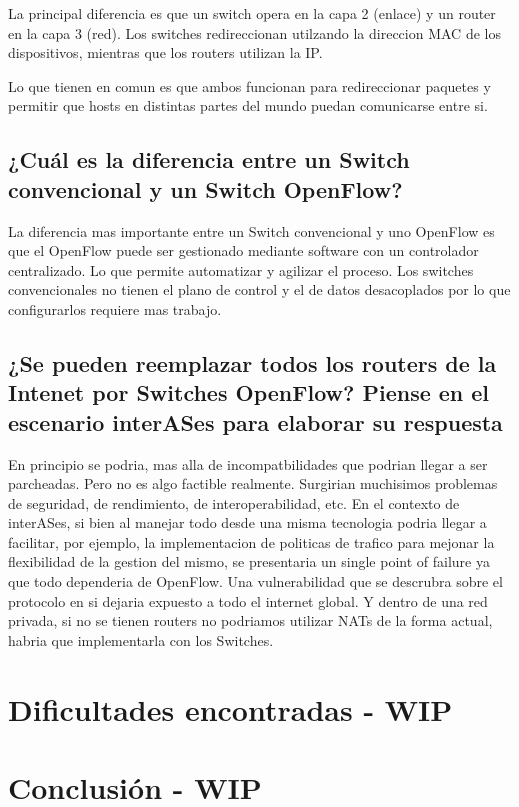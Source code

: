 \documentclass{article}
\begin{document}
La principal diferencia es que un switch opera en la capa 2 (enlace) y un router en la capa 3 (red).
Los switches redireccionan utilzando la direccion MAC de los dispositivos, mientras que los
routers utilizan la IP.

Lo que tienen en comun es que ambos funcionan para redireccionar paquetes y permitir
que hosts en distintas partes del mundo puedan comunicarse entre si.

\subsection{¿Cuál es la diferencia entre un Switch convencional y un Switch OpenFlow?}\label{detalle-el-protocolo-de-aplicaciuxf3n-desarrollado-en-este-trabajo.}

La diferencia mas importante entre un Switch convencional y uno OpenFlow es que el OpenFlow puede
ser gestionado mediante software con un controlador centralizado. Lo que permite automatizar
y agilizar el proceso.
Los switches convencionales no tienen el plano de control y el de datos desacoplados por lo que configurarlos requiere mas trabajo.

\subsection{¿Se pueden reemplazar todos los routers de la Intenet por Switches OpenFlow? Piense en el escenario interASes para elaborar su respuesta}\label{la-capa-de-transporte-del-stack-tcpip-ofrece-dos-protocolos-tcp-y-udp.-quuxe9-servicios-proveen-dichos-protocolos-cuuxe1les-son-sus-caracteruxedsticas-cuuxe1ndo-es-apropiado-utilizar-cada-uno}

En principio se podria, mas alla de incompatbilidades que podrian llegar a ser parcheadas. Pero no es algo factible realmente. Surgirian muchisimos problemas de seguridad, de rendimiento, de interoperabilidad, etc. En el contexto de interASes, si bien al manejar todo desde una misma tecnologia podria llegar a facilitar, por ejemplo, la implementacion de politicas de trafico para mejonar la flexibilidad de la gestion del mismo, se presentaria un single point of failure ya que todo dependeria de OpenFlow. Una vulnerabilidad que se descrubra sobre el protocolo en si dejaria expuesto a todo el internet global. Y dentro de una red privada, si no se tienen routers no podriamos utilizar NATs de la forma actual, habria que implementarla con los Switches. 

\section{Dificultades encontradas - WIP}\label{dificultades-encontradas}

\section{Conclusión - WIP}\label{conclusiuxf3n-wip}
\end{document}
